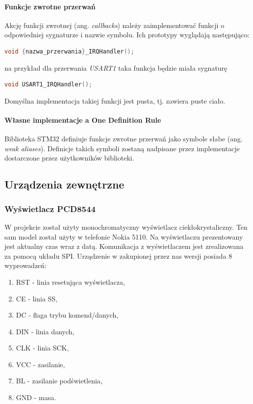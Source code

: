 \documentclass{article}
\begin{document}
\paragraph{Funkcje zwrotne przerwań}
Akcję funkcji zwrotnej (ang. \emph{callbacks}) należy zaimplementować funkcji
o odpowiedniej sygnaturze i nazwie symbolu. Ich prototypy wyglądają następująco:

\begin{center}
\begin{lstlisting}[language=C, basicstyle=\footnotesize]
void {nazwa_przerwania}_IRQHandler();
\end{lstlisting}
\end{center}

na przykład dla przerwania \emph{USART1} taka funkcja będzie miała sygnaturę

\begin{center}
\begin{lstlisting}[language=C, basicstyle=\footnotesize]
void USART1_IRQHandler();
\end{lstlisting}
\end{center}

Domyślna implementacja takiej funkcji jest pusta, tj. zawiera puste ciało.

\paragraph{Własne implementacje a One Definition Rule}
Biblioteka STM32 definiuje funkcje zwrotne przerwań jako symbole słabe
(ang. \emph{weak aliases}). Definicje takich symboli zostaną nadpisane przez
implementacje dostarczone przez użytkowników biblioteki.

\subsection{Urządzenia zewnętrzne}
\subsubsection{Wyświetlacz PCD8544}

W projekcie został użyty monochromatyczny wyświetlacz ciekłokrystaliczny. Ten sam model
został użyty w telefonie Nokia 5110. Na wyświetlaczu prezentowany jest aktualny czas wraz z datą.
Komunikacja z wyświetlaczem jest zrealizowana za pomocą układu SPI.
Urządzenie w zakupionej przez nas wersji posiada 8 wyprowadzeń:

\begin{enumerate}
    \item RST - linia resetująca wyświetlacza,
    \item CE - linia SS,
    \item DC - flaga trybu komend/danych,
    \item DIN - linia danych,
    \item CLK - linia SCK,
    \item VCC - zasilanie,
    \item BL - zasilanie podświetlenia,
    \item GND - masa.
\end{enumerate}
\end{document}
